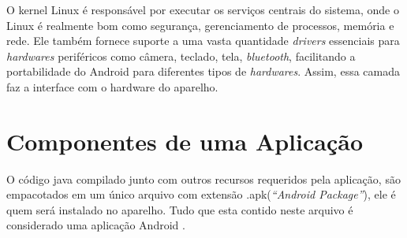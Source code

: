 O kernel Linux é responsável por executar os serviços centrais do sistema, onde o Linux é realmente bom como segurança, gerenciamento de processos, 
memória e rede. Ele também fornece suporte a uma vasta quantidade \textit{drivers} essenciais para \textit{hardwares} periféricos como câmera, teclado, 
tela, \textit{bluetooth}, facilitando a portabilidade do Android para diferentes tipos de \textit{hardwares}. 
Assim, essa camada faz a interface com o hardware do aparelho.

\section{Componentes de uma Aplicação}
  O código java compilado junto com outros recursos requeridos pela aplicação, são empacotados em um único arquivo com 
  extensão .apk(\textit{``Android Package''}), ele é quem será instalado no aparelho. 
  Tudo que esta contido neste arquivo é considerado uma aplicação Android \cite{android0}. 


